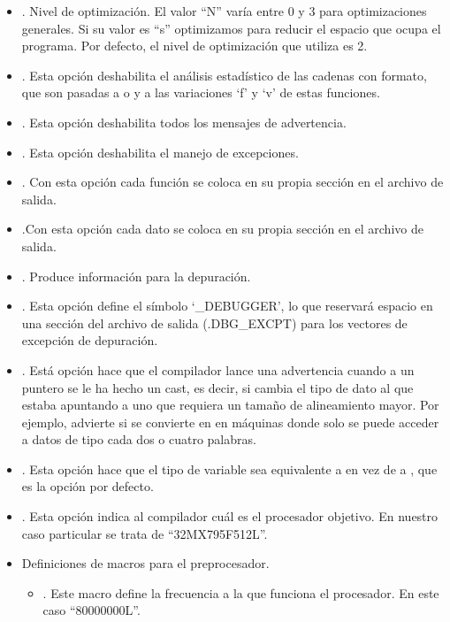 \begin{itemize}
    \item {}. Nivel de optimización. El valor ``N'' varía entre 0 y 3 para optimizaciones generales. Si su valor es ``s'' optimizamos para reducir el espacio que ocupa el programa. Por defecto, el nivel de optimización que utiliza  es 2.
    \item {}. Esta opción deshabilita el análisis estadístico de las cadenas con formato, que son pasadas a  o  y a las variaciones `f' y `v' de estas funciones.
    \item {}. Esta opción deshabilita todos los mensajes de advertencia.
    \item {}. Esta opción deshabilita el manejo de excepciones.
    \item {}. Con esta opción cada función se coloca en su propia sección en el archivo de salida.
    \item {}.Con esta opción cada dato se coloca en su propia sección en el archivo de salida.
    \item {}. Produce información para la depuración.
    \item {}. Esta opción define el símbolo `\_DEBUGGER', lo que reservará espacio en una sección del archivo de salida (.DBG\_EXCPT) para los vectores de excepción de depuración.
    \item {}. Está opción hace que el compilador lance una advertencia cuando a un puntero se le ha hecho un cast, es decir, si cambia el tipo de dato al que estaba apuntando a uno que requiera un tamaño de alineamiento mayor. Por ejemplo, advierte si  se convierte en  en máquinas donde solo se puede acceder a datos de tipo cada dos o cuatro palabras.
    \item {}. Esta opción hace que el tipo de variable  sea equivalente a  en vez de a , que es la opción por defecto.
    \item {}. Esta opción indica al compilador cuál es el procesador objetivo. En nuestro caso particular se trata de ``32MX795F512L''.
    \item Definiciones de macros para el preprocesador.
    \begin{itemize}
        \item {}. Este macro define la frecuencia a la que funciona el procesador. En este caso ``80000000L''.

\end{itemize}
\end{itemize}
